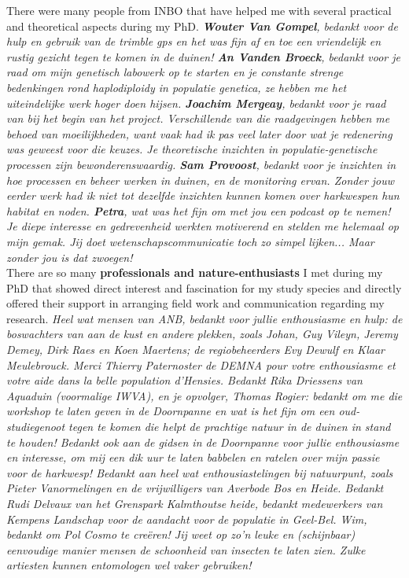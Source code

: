 \documentclass[10pt, twoside]{book} %
\begin{document}
\begin{small}
There were many people from INBO that have helped me with several practical and theoretical aspects during my PhD.  \textit{\textbf{Wouter Van Gompel}, bedankt voor de hulp en gebruik van de trimble gps en het was fijn af en toe een vriendelijk en rustig gezicht tegen te komen in de duinen! \textbf{An Vanden Broeck}, bedankt voor je raad om mijn genetisch labowerk op te starten en je constante strenge bedenkingen rond haplodiploidy in populatie genetica, ze hebben me het uiteindelijke werk hoger doen hijsen. \textbf{Joachim Mergeay}, bedankt voor je raad van bij het begin van het project. Verschillende van die raadgevingen hebben me behoed van moeilijkheden, want vaak had ik pas veel later door wat je redenering was geweest voor die keuzes. Je theoretische inzichten in populatie-genetische processen zijn bewonderenswaardig. \textbf{Sam Provoost}, bedankt voor je inzichten in hoe processen en beheer werken in duinen, en de monitoring ervan. Zonder jouw eerder werk had ik niet tot dezelfde inzichten kunnen komen over harkwespen hun habitat en noden. \textbf{Petra}, wat was het fijn om met jou een podcast op te nemen! Je diepe interesse en gedrevenheid werkten motiverend en stelden me helemaal op mijn gemak. Jij doet wetenschapscommunicatie toch zo simpel lijken... Maar zonder jou is dat zwoegen!}\\

There are so many \textbf{professionals and nature-enthusiasts} I met during my PhD that showed direct interest and fascination for my study species and directly offered their support in arranging field work and communication regarding my research. \textit{Heel wat mensen van ANB, bedankt voor jullie enthousiasme en hulp: de boswachters van aan de kust en andere plekken, zoals Johan, Guy Vileyn, Jeremy Demey, Dirk Raes en Koen Maertens; de regiobeheerders Evy Dewulf en Klaar Meulebrouck. Merci Thierry Paternoster de DEMNA pour votre enthousiasme et votre aide dans la belle population d'Hensies. Bedankt Rika Driessens van Aquaduin (voormalige IWVA), en je opvolger, Thomas Rogier: bedankt om me die workshop te laten geven in de Doornpanne en wat is het fijn om een oud-studiegenoot tegen te komen die helpt de prachtige natuur in de duinen in stand te houden! Bedankt ook aan de gidsen in de Doornpanne voor jullie enthousiasme en interesse, om mij een dik uur te laten babbelen en ratelen over mijn passie voor de harkwesp! Bedankt aan heel wat enthousiastelingen bij natuurpunt, zoals Pieter Vanormelingen en de vrijwilligers van Averbode Bos en Heide. Bedankt Rudi Delvaux van het Grenspark Kalmthoutse heide, bedankt medewerkers van Kempens Landschap voor de aandacht voor de populatie in Geel-Bel. Wim, bedankt om Pol Cosmo te creëren! Jij weet op zo'n leuke en (schijnbaar) eenvoudige manier mensen de schoonheid van insecten te laten zien. Zulke artiesten kunnen entomologen wel vaker gebruiken!}\\


\end{small}
\end{document}
